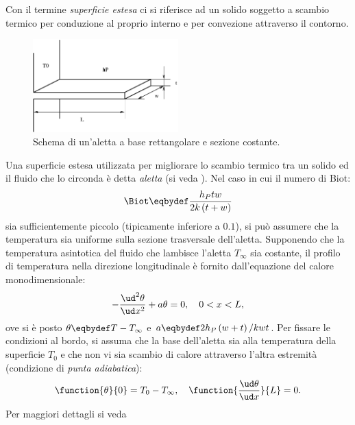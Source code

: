 Con il termine \emph{superficie estesa} ci si riferisce ad un solido soggetto a scambio termico per conduzione al proprio interno e per convezione attraverso il contorno. 
\begin{figure}
\centering
{}
\includegraphics[width=0.5\textwidth]{./figures/eps/fin.eps}
\caption{Schema di un'aletta a base rettangolare e sezione costante.}
\label{fig:fin}
\end{figure}
Una superficie estesa utilizzata per migliorare lo scambio termico tra un solido ed il fluido che lo circonda \`e detta \emph{aletta} (si veda ). Nel caso in cui il numero di Biot:
\begin{equation*}
\Biot \eqbydef \frac{h_P t w}{2 k \left( t + w \right)}
\end{equation*}
sia sufficientemente piccolo (tipicamente inferiore a $0.1$), si pu\`o assumere che la temperatura sia uniforme sulla sezione trasversale dell'aletta. Supponendo che la temperatura asintotica del fluido che lambisce l'aletta $T_{\infty}$ sia costante, il profilo di temperatura nella direzione longitudinale \`e fornito dall'equazione del calore monodimensionale:
\begin{equation}
-\frac{\ud^2 \theta}{\ud x^2} + a\theta = 0,\quad 0<x<L,
\label{eq:heat}
\end{equation}
ove si \`e posto $\theta\eqbydef T - T_{\infty}$ e $a \eqbydef 2h_P \left( w + t\right) / kwt$. Per fissare le condizioni al bordo, si assuma che la base dell'aletta sia alla temperatura della superficie $T_0$ e che non vi sia scambio di calore attraverso l'altra estremit\`a (condizione di \emph{punta adiabatica}):
\begin{equation*}
\function{\theta}{0} = T_0 - T_{\infty},\quad %
\function{\frac{\ud\theta}{\ud x}}{L} = 0.
\end{equation*}
Per maggiori dettagli si veda \cite{Incropera.DeWitt:1996}

